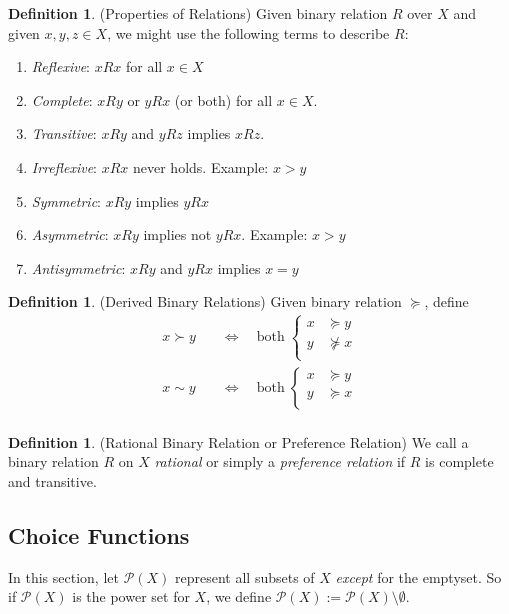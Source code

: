 \documentclass[12pt]{article}
\theoremstyle{plain}
\theoremstyle{definition}
\newtheorem{defn}[thm]{Definition}
\theoremstyle{remark}
\newcommand{\sP}{\mathscr{P}}
\newcommand{\calP}{\mathcal{P}}
\begin{document}
\begin{defn}(Properties of Relations)
Given binary relation $R$ over $X$ and given $x,y,z\in X$, we might use
the following terms to describe $R$:
\begin{enumerate}
  \item \emph{Reflexive}: $xRx$ for all $x\in X$
  \item \emph{Complete}: $xRy$ or $yRx$ (or both) for all $x\in X$.
  \item \emph{Transitive}: $xRy$ and $yRz$ implies $xRz$.
  \item \emph{Irreflexive}: $xRx$ never holds. Example: $x>y$
  \item \emph{Symmetric}: $xRy$ implies $yRx$
  \item \emph{Asymmetric}: $xRy$ implies not $yRx$. Example: $x>y$
  \item \emph{Antisymmetric}: $xRy$ and $yRx$ implies $x=y$
\end{enumerate}
\end{defn}

\begin{defn}(Derived Binary Relations)
Given binary relation $\succeq$, define
\begin{align*}
  x \succ y
  \quad&\iff\quad
  \text{both} \;
  \begin{cases}
    x &\succeq y \\
    y &\not\succeq x \\
  \end{cases} \\
  x \sim y
  \quad&\iff\quad
  \text{both} \;
  \begin{cases}
    x &\succeq y \\
    y &\succeq x \\
  \end{cases} \\
\end{align*}
\end{defn}

\begin{defn}(Rational Binary Relation or Preference Relation)
We call a binary relation $R$ on $X$ \emph{rational} or simply a
\emph{preference relation} if $R$ is complete and transitive.
\end{defn}


\subsection{Choice Functions}

In this section, let $\calP(X)$ represent all subsets of $X$
\emph{except} for the emptyset. So if $\sP(X)$ is the power set for $X$,
we define $\calP(X):=\sP(X)\setminus \emptyset$.
\end{document}

